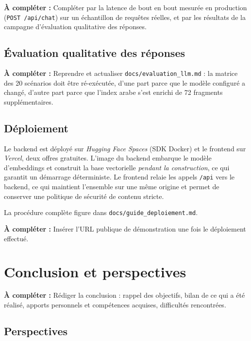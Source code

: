 \documentclass[a4paper,11pt,twoside]{report}
\newcommand{\todo}[1]{%
  \begin{tcolorbox}[colback=yellow!12,colframe=orange!70!black,left=4pt,right=4pt,top=3pt,bottom=3pt]
  \small\textbf{À compléter :} #1
  \end{tcolorbox}}
\begin{document}
\todo{Compléter par la latence de bout en bout mesurée en production
(\texttt{POST /api/chat}) sur un échantillon de requêtes réelles, et par les
résultats de la campagne d'évaluation qualitative des réponses.}

\section{Évaluation qualitative des réponses}

\todo{Reprendre et actualiser \texttt{docs/evaluation\_llm.md} : la matrice des
20 scénarios doit être ré-exécutée, d'une part parce que le modèle configuré a
changé, d'autre part parce que l'index arabe s'est enrichi de 72 fragments
supplémentaires.}

\section{Déploiement}

Le backend est déployé sur \emph{Hugging Face Spaces} (SDK Docker) et le
frontend sur \emph{Vercel}, deux offres gratuites. L'image du backend embarque le
modèle d'embeddings et construit la base vectorielle \emph{pendant la
construction}, ce qui garantit un démarrage déterministe. Le frontend relaie les
appels \texttt{/api} vers le backend, ce qui maintient l'ensemble sur une même
origine et permet de conserver une politique de sécurité de contenu stricte.

La procédure complète figure dans \texttt{docs/guide\_deploiement.md}.

\todo{Insérer l'URL publique de démonstration une fois le déploiement effectué.}

\chapter*{Conclusion et perspectives}

\todo{Rédiger la conclusion : rappel des objectifs, bilan de ce qui a été
réalisé, apports personnels et compétences acquises, difficultés rencontrées.}

\section*{Perspectives}
\end{document}
